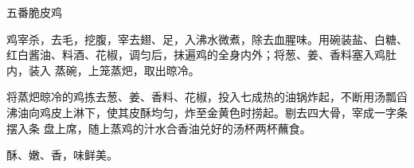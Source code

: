 \begin{recipe}{五番脆皮鸡}

\ingredients


\preparation

\step 鸡宰杀，去毛，挖腹，宰去翅、足，入沸水微煮，除去血腥味。用碗装盐、白糖、
红白酱油、料酒、花椒，调匀后，抹遍鸡的全身内外；将葱、姜、香料塞入鸡肚内，装入
蒸碗，上笼蒸𤆵，取出晾冷。

\step 将蒸𤆵晾冷的鸡拣去葱、姜、香料、花椒，投入七成热的油锅炸起，不断用汤瓢舀
沸油向鸡皮上淋下，使其皮酥均匀，炸至金黄色时捞起。剔去四大骨，宰成一字条摆入条
盘上席，随上蒸鸡的汁水合香油兑好的汤杯两杯蘸食。

\features

酥、嫩、香，味鲜美。

\end{recipe}

